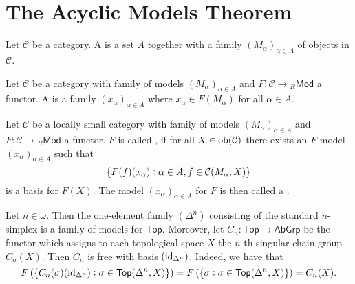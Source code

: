 \section*{The Acyclic Models Theorem}

\begin{definition}[Models]
	Let $\mathcal{C}$ be a category. A  is a set $A$ together with a family $(M_\alpha)_{\alpha \in A}$ of objects in $\mathcal{C}$.
\end{definition}

\begin{definition}[$F$-Model]
	Let $\mathcal{C}$ be a category with family of models $(M_\alpha)_{\alpha \in A}$ and $F : \mathcal{C} \to {_{R}\mathsf{Mod}}$ a functor. A  is a family $(x_\alpha)_{\alpha \in A}$ where $x_\alpha \in F(M_\alpha)$ for all $\alpha \in A$.
\end{definition}

\begin{definition}
	Let $\mathcal{C}$ be a locally small category with family of models $(M_\alpha)_{\alpha \in A}$ and $F : \mathcal{C} \to {_{R}\mathsf{Mod}}$ a functor. $F$ is called , if for all $X \in \operatorname{ob}(\mathcal{C})$ there exists an $F$-model $(x_\alpha)_{\alpha \in A}$ such that
	\begin{equation*}
		\cbr[0]{F(f)(x_\alpha) : \alpha \in A, f \in \mathcal{C}(M_\alpha,X)}
	\end{equation*}
	\noindent is a basis for $F(X)$. The model $(x_\alpha)_{\alpha \in A}$ for $F$ is then called a .
\end{definition}

\begin{example}
	Let $n \in \omega$. Then the one-element family $(\Delta^n)$ consisting of the standard $n$-simplex is a family of models for $\mathsf{Top}$. Moreover, let $C_n : \mathsf{Top} \to \mathsf{AbGrp}$ be the functor which assigns to each topological space $X$ the $n$-th singular chain group $C_n(X)$. Then $C_n$ is free with basis $(\operatorname{id}_{\Delta^n})$. Indeed, we have that
\begin{equation*}
	F\del[0]{\cbr[0]{C_n(\sigma)(\id_{\Delta^n}) : \sigma \in \mathsf{Top}(\Delta^n,X)}} = F\del[0]{\cbr[0]{\sigma : \sigma \in \mathsf{Top}(\Delta^n,X)}} = C_n(X).
\end{equation*}
\end{example}


